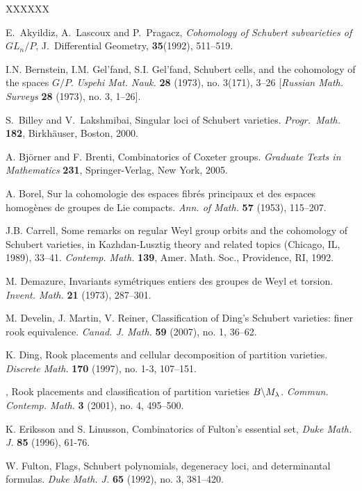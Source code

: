 \documentclass[12pt,dvips]{amsart}
\theoremstyle{plain}
\theoremstyle{definition}
\theoremstyle{remark}
\numberwithin{equation}{section}
\begin{document}
\begin{thebibliography}{XXXXXX}

E.~Akyildiz, A.~Lascoux and P.~Pragacz, \emph{Cohomology of 
Schubert subvarieties of $GL_n/P$}, J.~Differential Geometry, 
{\bf 35}(1992), 511--519.

I.N. Bernstein, I.M. Gel'fand, S.I. Gel'fand, 
Schubert cells, and the cohomology of the spaces $G/P$.
{\it Uspehi Mat. Nauk.} {\bf 28} (1973), no. 3(171), 3--26 
[{\it Russian Math. Surveys} {\bf 28} (1973), no. 3, 1--26]. 

S.~Billey and V.~Lakshmibai, Singular loci of Schubert
varieties.  {\it Progr.~Math.} {\bf 182}, Birkh\"{a}user, Boston, 2000.

A. Bj\"orner and F. Brenti, 
Combinatorics of Coxeter groups.
{\it Graduate Texts in Mathematics} {\bf 231},
Springer-Verlag, New York, 2005. 


A. Borel,
Sur la cohomologie des espaces fibr\'es principaux et des espaces homog\`enes 
de groupes de Lie compacts. 
{\it Ann. of Math.}  {\bf 57}  (1953), 115--207. 

J.B. Carrell,
Some remarks on regular Weyl group orbits and the 
cohomology of Schubert varieties, in
Kazhdan-Lusztig theory and related topics (Chicago, IL, 1989), 33--41.
{\it Contemp. Math.} {\bf 139},
Amer. Math. Soc., Providence, RI, 1992. 

M. Demazure,
Invariants sym\'etriques entiers des groupes de Weyl et torsion.
{\it Invent. Math.} {\bf 21} (1973), 287--301. 

M. Develin, J. Martin, V. Reiner,
Classification of Ding's Schubert varieties: finer rook equivalence. 
{\it Canad. J. Math.} {\bf 59} (2007), no. 1, 36--62. 

K. Ding,
Rook placements and cellular decomposition of partition varieties. 
{\it Discrete Math.} {\bf 170} (1997), no. 1-3, 107--151. 

\bysame,
Rook placements and classification of partition 
varieties $B\backslash M\sb \lambda$.  
{\it Commun. Contemp. Math.}  {\bf 3}  (2001),  no. 4, 495--500. 

K. Eriksson and S. Linusson,
Combinatorics of Fulton's essential set,
{\it Duke Math. J.} {\bf 85} (1996), 61-76. 

W. Fulton, 
Flags, Schubert polynomials, degeneracy loci, and determinantal formulas.  
{\it Duke Math. J.}  {\bf 65}  (1992),  no. 3, 381--420.


\end{thebibliography}
\end{document}
